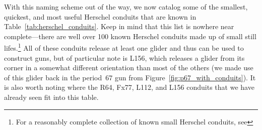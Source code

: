 With this naming scheme out of the way, we now catalog some of the smallest, quickest, and most useful Herschel conduits that are known in Table~\ref{tab:herschel_conduits}. Keep in mind that this list is nowhere near complete---there are well over 100 known Herschel conduits made up of small still lifes.\footnote{For a reasonably complete collection of known small Herschel conduits, see } All of these conduits release at least one glider and thus can be used to construct guns, but of particular note is L156, which releases a glider from its corner in a somewhat different orientation than most of the others (we made use of this glider back in the period~$67$ gun from Figure~\ref{fig:p67_with_conduits}). It is also worth noting where the R64, Fx77, L112, and L156 conduits that we have already seen fit into this table.


